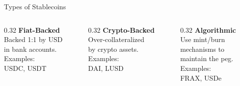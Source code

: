 \documentclass[aspectratio=169, 11pt]{beamer}
\begin{document}
\begin{frame}{Types of Stablecoins}
  \begin{columns}[T]
    \begin{column}{0.32\textwidth}
      \textcolor{ap3orange}{\textbf{Fiat-Backed}}\\[6pt]
      \textcolor{ap3light}{\small
        Backed 1:1 by USD\\
        in bank accounts.\\[4pt]
        \textcolor{ap3slate}{\footnotesize Examples:\\USDC, USDT}
      }
    \end{column}
    \begin{column}{0.32\textwidth}
      \textcolor{ap3orange}{\textbf{Crypto-Backed}}\\[6pt]
      \textcolor{ap3light}{\small
        Over-collateralized\\
        by crypto assets.\\[4pt]
        \textcolor{ap3slate}{\footnotesize Examples:\\DAI, LUSD}
      }
    \end{column}
    \begin{column}{0.32\textwidth}
      \textcolor{ap3orange}{\textbf{Algorithmic}}\\[6pt]
      \textcolor{ap3light}{\small
        Use mint/burn\\
        mechanisms to\\
        maintain the peg.\\[4pt]
        \textcolor{ap3slate}{\footnotesize Examples:\\FRAX, USDe}
      }
    \end{column}
  \end{columns}

\end{frame}
\end{document}
